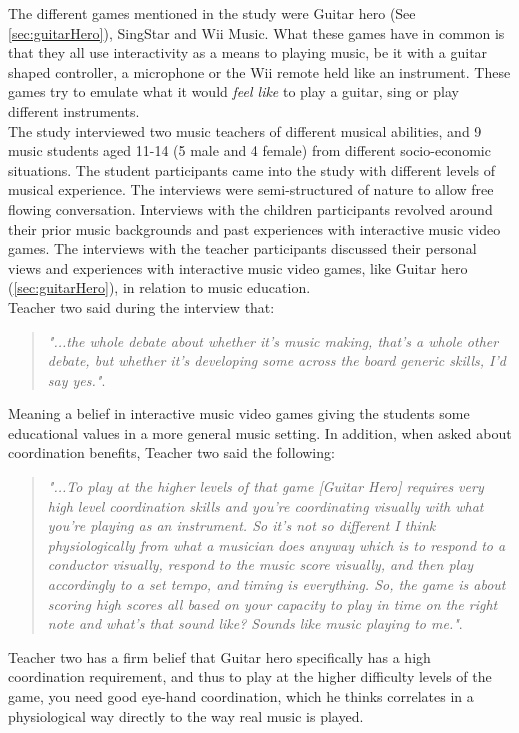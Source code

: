 The different games mentioned in the study were Guitar hero (See \autoref{sec:guitarHero}), SingStar and Wii Music. What these games have in common is that they all use interactivity as a means to playing music, be it with a guitar shaped controller, a microphone or the Wii remote held like an instrument. These games try to emulate what it would \textit{feel like} to play a guitar, sing or play different instruments.\\

The study interviewed two music teachers of different musical abilities, and 9 music students aged 11-14 (5 male and 4 female) from different socio-economic situations. The student participants came into the study with different levels of musical experience. The interviews were semi-structured of nature to allow free flowing conversation. Interviews with the children participants revolved around their prior music backgrounds and past experiences with interactive music video games. The interviews with the teacher participants discussed their personal views and experiences with interactive music video games, like Guitar hero (\autoref{sec:guitarHero}), in relation to music education.\\

Teacher two said during the interview that:
\begin{quote}
	\textit{"...the whole debate about whether it’s music making, that’s a whole other debate, but whether it’s developing some across the board generic skills, I’d say yes."}\cite[p.~98]{interactiveMusicVideoGames}.\\
\end{quote}
Meaning a belief in interactive music video games giving the students some educational values in a more general music setting. In addition, when asked about coordination benefits, Teacher two said the following:
\begin{quote}
	\textit{"...To play at the higher levels of that game [Guitar Hero] requires very high level coordination skills and you’re coordinating visually with what you’re playing as an instrument. So it’s not so different I think physiologically from what a musician does anyway which is to respond to a conductor visually, respond to the music score visually, and then play accordingly to a set tempo, and timing is everything. So, the game is about scoring high scores all based on your capacity to play in time on the right note and what’s that sound like? Sounds like music playing to me."}\cite[p.~98]{interactiveMusicVideoGames}.\\
\end{quote}
Teacher two has a firm belief that Guitar hero specifically has a high coordination requirement, and thus to play at the higher difficulty levels of the game, you need good eye-hand coordination, which he thinks correlates in a physiological way directly to the way real music is played.\\

